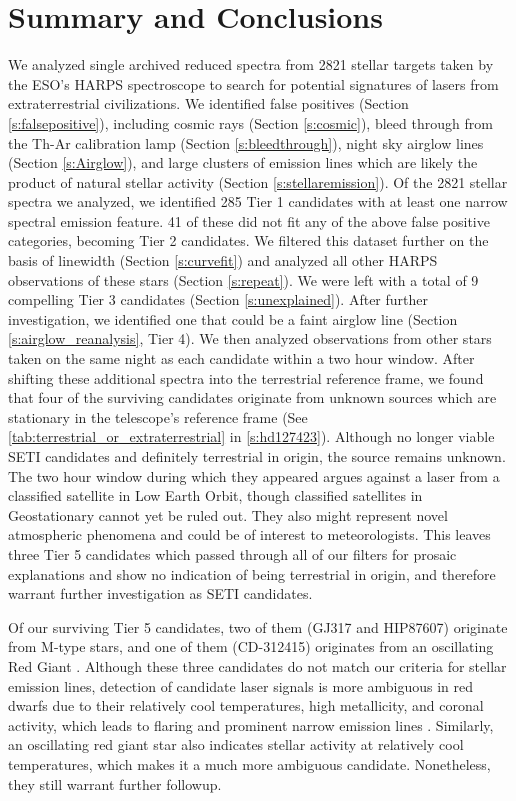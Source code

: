 \documentclass[twocolumn]{aastex701}
\begin{document}
\section{Summary and Conclusions}
We analyzed single archived reduced spectra from 2821 stellar targets taken by the ESO’s HARPS spectroscope to search for potential signatures of lasers from extraterrestrial civilizations. We identified false positives (Section \ref{s:falsepositive}), including cosmic rays (Section \ref{s:cosmic}), bleed through from the Th-Ar calibration lamp (Section \ref{s:bleedthrough}), night sky airglow lines (Section \ref{s:Airglow}), and large clusters of emission lines which are likely the product of natural stellar activity (Section \ref{s:stellaremission}). Of the 2821 stellar spectra we analyzed, we identified 285 Tier 1 candidates with at least one narrow spectral emission feature.  41 of these did not fit any of the above false positive categories, becoming Tier 2 candidates. We filtered this dataset further on the basis of linewidth (Section \ref{s:curvefit}) and analyzed all other HARPS observations of these stars (Section \ref{s:repeat}). We were left with a total of 9 compelling Tier 3 candidates (Section \ref{s:unexplained}). After further investigation, we identified one that could be a faint airglow line (Section \ref{s:airglow_reanalysis}, Tier 4). We then analyzed observations from other stars taken on the same night as each candidate within a two hour window. After shifting these additional spectra into the terrestrial reference frame, we found that four of the surviving candidates originate from unknown sources which are stationary in the telescope's reference frame (See 
\ref{tab:terrestrial_or_extraterrestrial} in \ref{s:hd127423}). Although no longer viable SETI candidates and definitely terrestrial in origin, the source remains unknown. The two hour window during which they appeared argues against a laser from a classified satellite in Low Earth Orbit, though classified satellites in Geostationary cannot yet be ruled out. They also might represent novel atmospheric phenomena and could be of interest to meteorologists. This leaves three Tier 5 candidates which passed through all of our filters for prosaic explanations and show no indication of being terrestrial in origin, and therefore warrant further investigation as SETI candidates.

Of our surviving Tier 5 candidates, two of them (GJ317 and HIP87607) originate from M-type stars, and one of them (CD-312415) originates from an oscillating Red Giant \citep{CD-312415_RED_GIANT}. Although these three candidates do not match our criteria for stellar emission lines, detection of candidate laser signals is more ambiguous in red dwarfs due to their relatively cool temperatures, high metallicity, and coronal activity, which leads to flaring and prominent narrow emission lines \citep{Marcy_2021}. Similarly, an oscillating red giant star also indicates stellar activity at relatively cool temperatures, which makes it a much more ambiguous candidate. Nonetheless, they still warrant further followup. 
\end{document}
